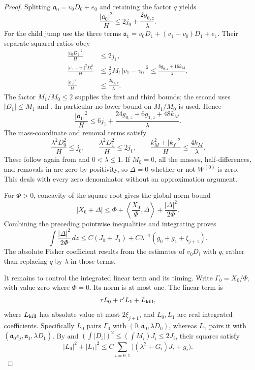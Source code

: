 \begin{proof}
Splitting $\mathfrak a_0=v_0D_0+e_0$ and retaining the factor $q$ yields
\begin{equation}
 \frac{|\mathfrak a_0|^2}{H}\le2j_0+\frac{2g_{0,z}}\lambda.
 \label{eq:paths-first-remainder}
\end{equation}
For the child jump use the three terms
$\mathfrak a_1=v_0D_1+(v_1-v_0)D_1+e_1$.  Their separate squared ratios obey
\begin{align*}
 \frac{|v_0D_1|^2}{H}&\le2j_1,\\
 \frac{|v_1-v_0|^2D_1^2}{H}
   &\le\frac{2}{\lambda}M_1|v_1-v_0|^2
       \le\frac{8g_{0,z}+16k_M}{\lambda},\\
 \frac{|e_1|^2}{H}&\le\frac{2g_{1,z}}\lambda.
\end{align*}
The factor $M_1/M_0\le2$ supplies the first and third bounds; the second
uses $|D_1|\le M_1$ and .  In particular no lower
bound on $M_1/M_0$ is used.  Hence
\begin{equation}
 \frac{|\mathfrak a_1|^2}{H}
 \le6j_1+\frac{24g_{0,z}+6g_{1,z}+48k_M}{\lambda}.
 \label{eq:paths-second-remainder}
\end{equation}
The mass-coordinate and removal terms satisfy
\[
 \frac{\lambda^2D_0^2}{H}\le j_0,
 \qquad \frac{\lambda^2D_1^2}{H}\le2j_1,
 \qquad \frac{k_M^2+|k_f|^2}{H}\le\frac{4k_M}{\lambda}.
\]
These follow again from  and
$0<\lambda\le1$.  If $M_0=0$, all the masses, half-differences, and
removals in  are zero by positivity, so
$\Delta=0$ whether or not $W^{(0)}$ is zero.  This deals with every zero
denominator without an approximation argument.

For $\Phi>0$, concavity of the square root gives the global norm bound
\[
 |X_0+\Delta|\le\Phi+\left\langle\frac{X_0}{\Phi},\Delta\right\rangle
                              +\frac{|\Delta|^2}{2\Phi}.
\]
Combining the preceding pointwise inequalities and integrating proves
\begin{equation}
 \int\frac{|\Delta|^2}{2\Phi}\,dz
 \le C(J_0+J_1)+C\lambda^{-1}(g_0+g_1+\xi_{j+1}).
 \label{eq:paths-norm-remainder}
\end{equation}
The absolute Fisher coefficient results from the estimates of $v_0D_i$
with $q$, rather than replacing $q$ by $\lambda$ in those terms.

It remains to control the integrated linear term and its timing.  Write
$\Gamma_0=X_0/\Phi$, with value zero where $\Phi=0$.  Its norm is at most
one.  The linear term is
\[
 r L_0+r'L_1+L_{\rm kill},
\]
where $L_{\rm kill}$ has absolute value at most $2\xi_{j+1}$, and
$L_0,L_1$ are real integrated coefficients.  Specifically $L_0$ pairs
$\Gamma_0$ with $(0,\mathfrak a_0,\lambda D_0)$, whereas $L_1$ pairs it with
$(\mathfrak a_0\epsilon_j,\mathfrak a_1,\lambda D_1)$.  By
 and
$(\int|D_i|)^2\le(\int M_i)J_i\le2J_i$, their squares satisfy
\begin{equation}
 |L_0|^2+|L_1|^2
 \le C\sum_{i=0,1}\big((\lambda^2+G_i)J_i+g_i\big).
 \label{eq:paths-linear-variance}
\end{equation}


\end{proof}
